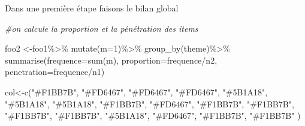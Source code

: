 \documentclass[
]{book}
\newenvironment{Shaded}{\begin{snugshade}}{\end{snugshade}}
\newcommand{\AttributeTok}[1]{\textcolor[rgb]{0.77,0.63,0.00}{#1}}
\newcommand{\CommentTok}[1]{\textcolor[rgb]{0.56,0.35,0.01}{\textit{#1}}}
\newcommand{\DecValTok}[1]{\textcolor[rgb]{0.00,0.00,0.81}{#1}}
\newcommand{\FunctionTok}[1]{\textcolor[rgb]{0.00,0.00,0.00}{#1}}
\newcommand{\NormalTok}[1]{#1}
\newcommand{\OtherTok}[1]{\textcolor[rgb]{0.56,0.35,0.01}{#1}}
\newcommand{\SpecialCharTok}[1]{\textcolor[rgb]{0.00,0.00,0.00}{#1}}
\newcommand{\StringTok}[1]{\textcolor[rgb]{0.31,0.60,0.02}{#1}}
\begin{document}
Dans une première étape faisons le bilan global

\begin{Shaded}
\begin{Highlighting}[]
\CommentTok{\#on calcule la proportion et la pénétration des items}

\NormalTok{foo2 }\OtherTok{\textless{}{-}}\NormalTok{foo1}\SpecialCharTok{\%\textgreater{}\%} 
  \FunctionTok{mutate}\NormalTok{(}\AttributeTok{m=}\DecValTok{1}\NormalTok{)}\SpecialCharTok{\%\textgreater{}\%}
  \FunctionTok{group\_by}\NormalTok{(theme)}\SpecialCharTok{\%\textgreater{}\%}
  \FunctionTok{summarise}\NormalTok{(}\AttributeTok{frequence=}\FunctionTok{sum}\NormalTok{(m),}
            \AttributeTok{proportion=}\NormalTok{frequence}\SpecialCharTok{/}\NormalTok{n2,}
            \AttributeTok{penetration=}\NormalTok{frequence}\SpecialCharTok{/}\NormalTok{n1)}


\NormalTok{col}\OtherTok{\textless{}{-}}\FunctionTok{c}\NormalTok{(}\StringTok{"\#F1BB7B"}\NormalTok{,}
       \StringTok{"\#FD6467"}\NormalTok{,}
       \StringTok{"\#FD6467"}\NormalTok{,}
       \StringTok{"\#FD6467"}\NormalTok{,}
       \StringTok{"\#5B1A18"}\NormalTok{,}
       \StringTok{"\#5B1A18"}\NormalTok{,}
       \StringTok{"\#5B1A18"}\NormalTok{,}
       \StringTok{"\#F1BB7B"}\NormalTok{,}
       \StringTok{"\#FD6467"}\NormalTok{,}
       \StringTok{"\#F1BB7B"}\NormalTok{,}
       \StringTok{"\#F1BB7B"}\NormalTok{,}
       \StringTok{"\#F1BB7B"}\NormalTok{,}
       \StringTok{"\#F1BB7B"}\NormalTok{,}
       \StringTok{"\#5B1A18"}\NormalTok{,}
       \StringTok{"\#FD6467"}\NormalTok{,}
       \StringTok{"\#F1BB7B"}\NormalTok{,}
       \StringTok{"\#F1BB7B"}
\NormalTok{       )}


\end{Highlighting}
\end{Shaded}
\end{document}
